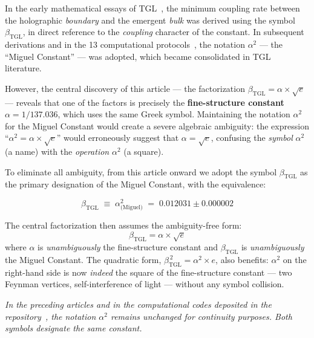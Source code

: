 \documentclass[12pt,a4paper,twoside]{article}
\newcommand{\betatgl}{\beta_{\!\scriptscriptstyle\mathrm{TGL}}}
\newcommand{\boundary}{\textit{boundary}}
\newcommand{\bulk}{\textit{bulk}}
\begin{document}
\begin{factorbox}[title={Note on notational evolution}]
In the early mathematical essays of TGL~\cite{Miguel2025Alpha2}, the minimum coupling rate between the holographic \boundary{} and the emergent \bulk{} was derived using the symbol $\beta_{\mathrm{TGL}}$, in direct reference to the \textit{coupling} character of the constant. In subsequent derivations and in the 13 computational protocols~\cite{Miguel2026Fronteira, Miguel2026LastString}, the notation $\alpha^2$ --- the ``Miguel Constant'' --- was adopted, which became consolidated in TGL literature.

However, the central discovery of this article --- the factorization $\betatgl = \alpha \times \sqrt{e}$ --- reveals that one of the factors is precisely the \textbf{fine-structure constant} $\alpha = 1/137.036$, which uses the same Greek symbol. Maintaining the notation $\alpha^2$ for the Miguel Constant would create a severe algebraic ambiguity: the expression ``$\alpha^2 = \alpha \times \sqrt{e}$'' would erroneously suggest that $\alpha = \sqrt{e}$, confusing the \textit{symbol} $\alpha^2$ (a name) with the \textit{operation} $\alpha^2$ (a square).

To eliminate all ambiguity, from this article onward we adopt the symbol $\betatgl$ as the primary designation of the Miguel Constant, with the equivalence:
%
\begin{equationbox}[title={Notational equivalence}]
\begin{equation}
\boxed{\;\betatgl \;\equiv\; \alpha^2_{\text{(Miguel)}} \;=\; 0.012031 \pm 0.000002\;}
\label{eq:equivalencia}
\end{equation}
\end{equationbox}
%
The central factorization then assumes the ambiguity-free form:
%
\begin{equation}
\betatgl = \alpha \times \sqrt{e}
\label{eq:fatoracao_limpa}
\end{equation}
%
where $\alpha$ is \textit{unambiguously} the fine-structure constant and $\betatgl$ is \textit{unambiguously} the Miguel Constant. The quadratic form, $\betatgl^{\,2} = \alpha^2 \times e$, also benefits: $\alpha^2$ on the right-hand side is now \textit{indeed} the square of the fine-structure constant --- two Feynman vertices, self-interference of light --- without any symbol collision.

\medskip
\noindent\textit{In the preceding articles and in the computational codes deposited in the repository~\cite{Miguel2026GitHub}, the notation $\alpha^2$ remains unchanged for continuity purposes. Both symbols designate the same constant.}
\end{factorbox}
\end{document}

